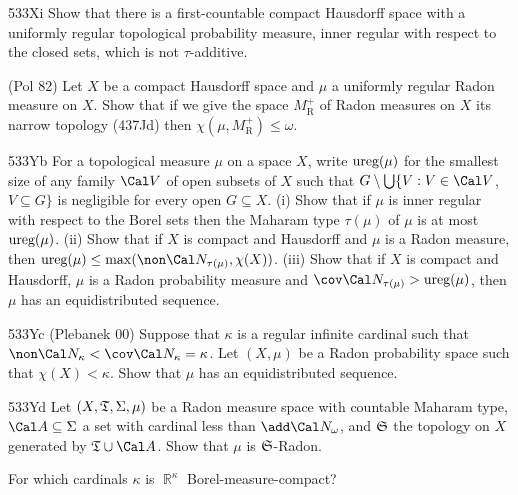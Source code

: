 {\spheader 533Xi Show that there is a first-countable compact Hausdorff
space with a uniformly regular topological probability measure,
inner regular with respect to the closed sets, which is not
$\tau$-additive.   

({\smc Pol 82}) Let $X$ be a compact Hausdorff space and
$\mu$ a uniformly regular Radon measure on $X$.   Show that if we give
the space $M^+_{\text{R}}$ of Radon measures on $X$ its narrow topology
(437Jd) then $\chi(\mu,M^+_{\text{R}})\le\omega$.

\spheader 533Yb For a topological measure $\mu$ on a space
$X$, write $\mathop{\text{ureg}}(\mu)$ for the smallest size of any family $\Cal V$ of
open subsets of $X$ such that
$G\setminus\bigcup\{V:V\in\Cal V$, $V\subseteq G\}$ is negligible for every
open $G\subseteq X$.   (i) Show that if $\mu$ is inner regular with
respect to the Borel sets then the Maharam type $\tau(\mu)$ of $\mu$
is at most $\mathop{\text{ureg}}(\mu)$.   (ii) Show that if $X$ is compact and Hausdorff
and $\mu$ is a Radon measure, then
$\ureg(\mu)\le\max(\non\Cal N_{\tau(\mu)},\chi(X))$.
(iii) Show that if $X$ is compact and Hausdorff,
$\mu$ is a Radon probability measure and
$\cov\Cal N_{\tau(\mu)}>\ureg(\mu)$, then $\mu$ has an equidistributed
sequence.

\spheader 533Yc ({\smc Plebanek 00})  Suppose that $\kappa$ is a regular
infinite cardinal such that
$\non\Cal N_{\kappa}<\cov\Cal N_{\kappa}=\kappa$.   Let $(X,\mu)$ be a
Radon probability space such that $\chi(X)<\kappa$.   Show that $\mu$
has an equidistributed sequence.

\spheader 533Yd Let $(X,\frak T,\Sigma,\mu)$ be a Radon measure space with
countable Maharam type, $\Cal A\subseteq\Sigma$ a set with cardinal less
than $\add\Cal N_{\omega}$, and $\frak S$ the topology on $X$ generated by
$\frak T\cup\Cal A$.   Show that $\mu$ is $\frak S$-Radon.
}%

 For which cardinals $\kappa$ is $\BbbR^{\kappa}$
Borel-measure-compact?


